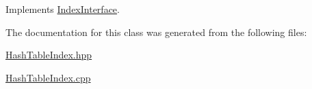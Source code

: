 Implements \hyperlink{class_index_interface_a7b2ae510fa62eebb654708b90972c1b6}{Index\+Interface}.



The documentation for this class was generated from the following files\+:\begin{DoxyCompactItemize}
\item 
\hyperlink{_hash_table_index_8hpp}{Hash\+Table\+Index.\+hpp}\item 
\hyperlink{_hash_table_index_8cpp}{Hash\+Table\+Index.\+cpp}\end{DoxyCompactItemize}
